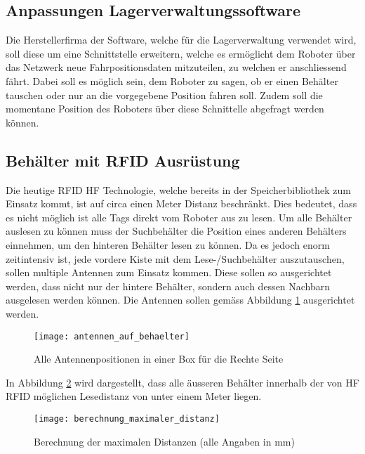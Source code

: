 \subsection{Anpassungen Lagerverwaltungssoftware}
\label{sec:roboterSWAnpassung}
Die Herstellerfirma der Software, welche für die Lagerverwaltung verwendet wird, soll diese um eine Schnittstelle erweitern, welche es ermöglicht dem Roboter über das Netzwerk neue Fahrpositionsdaten mitzuteilen, zu welchen er anschliessend fährt. Dabei soll es möglich sein, dem Roboter zu sagen, ob er einen Behälter tauschen oder nur an die vorgegebene Position fahren soll. Zudem soll die momentane Position des Roboters über diese Schnittelle abgefragt werden können. 

\subsection{Behälter mit RFID Ausrüstung}
\label{sec:behaelterMitRFID}
Die heutige RFID HF Technologie, welche bereits in der Speicherbibliothek zum Einsatz kommt, ist auf circa einen Meter Distanz beschränkt. Dies bedeutet, dass es nicht möglich ist alle Tags direkt vom Roboter aus zu lesen. Um alle Behälter auslesen zu können muss der Suchbehälter die Position eines anderen Behälters einnehmen, um den hinteren Behälter lesen zu können. Da es jedoch enorm zeitintensiv ist, jede vordere Kiste mit dem Lese-/Suchbehälter auszutauschen, sollen multiple Antennen zum Einsatz kommen. Diese sollen so ausgerichtet werden, dass nicht nur der hintere Behälter, sondern auch dessen Nachbarn ausgelesen werden können.
Die Antennen sollen gemäss Abbildung \ref{fig:antennenPositionen} ausgerichtet werden.

\begin{figure}[htb]
	\centering
	\texttt{[image: antennen\_auf\_behaelter]}
	\caption{Alle Antennenpositionen in einer Box für die Rechte Seite}
	\label{fig:antennenPositionen}
\end{figure}

In Abbildung \ref{fig:distanzcalc} wird dargestellt, dass alle äusseren Behälter innerhalb der von HF RFID möglichen Lesedistanz von unter einem Meter liegen.

\begin{figure}[htb]
	\centering
	\texttt{[image: berechnung\_maximaler\_distanz]}
	\caption{Berechnung der maximalen Distanzen (alle Angaben in mm)}
	\label{fig:distanzcalc}
\end{figure}


